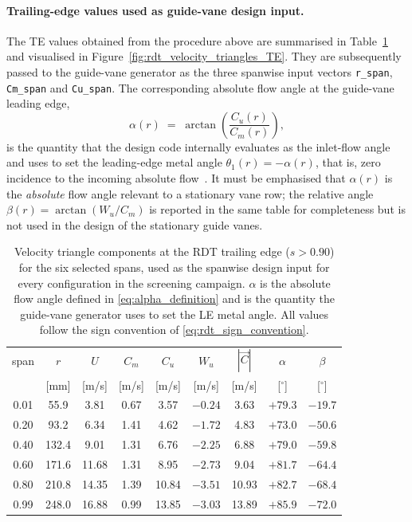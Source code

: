 \paragraph{Trailing-edge values used as guide-vane design input.}
The TE values obtained from the procedure above are summarised in
Table~\ref{tab:rdt_te_values} and visualised in
Figure~\ref{fig:rdt_velocity_triangles_TE}. They are subsequently passed
to the guide-vane generator as the three spanwise input vectors
\texttt{r\_span}, \texttt{Cm\_span} and \texttt{Cu\_span}. The
corresponding absolute flow angle at the guide-vane leading edge,
%
\begin{equation}
\alpha(r) \;=\; \arctan\!\left(\frac{C_u(r)}{C_m(r)}\right),
\label{eq:alpha_definition}
\end{equation}
%
is the quantity that the design code internally evaluates as the
inlet-flow angle and uses to set the leading-edge metal angle
$\theta_1(r)=-\alpha(r)$, that is, zero incidence to the incoming
absolute flow~\cite{Leonsen2025}. It must be emphasised that
$\alpha(r)$ is the \emph{absolute} flow angle relevant to a stationary
vane row; the relative angle $\beta(r)=\arctan(W_u/C_m)$ is reported in
the same table for completeness but is not used in the design of the
stationary guide vanes.
 
\begin{table}[H]
  \centering
  \caption[RDT trailing-edge velocity triangle at six spans]{Velocity
  triangle components at the RDT trailing edge ($s>0.90$) for the six
  selected spans, used as the spanwise design input for every
  configuration in the screening campaign. $\alpha$ is the absolute
  flow angle defined in \eqref{eq:alpha_definition} and is the quantity
  the guide-vane generator uses to set the LE metal angle. All values
  follow the sign convention of \eqref{eq:rdt_sign_convention}.}
  \label{tab:rdt_te_values}
  \begin{tabular}{ccccccccc}
    \hline
    span & $r$ & $U$ & $C_m$ & $C_u$ & $W_u$ & $|\vec{C}|$ & $\alpha$ & $\beta$ \\
         & [mm] & [m/s] & [m/s] & [m/s] & [m/s] & [m/s] & [$^\circ$] & [$^\circ$] \\
    \hline
    0.01 &  55.9 &  3.81 & 0.67 &  3.57 & $-0.24$ &  3.63 & $+79.3$ & $-19.7$ \\
    0.20 &  93.2 &  6.34 & 1.41 &  4.62 & $-1.72$ &  4.83 & $+73.0$ & $-50.6$ \\
    0.40 & 132.4 &  9.01 & 1.31 &  6.76 & $-2.25$ &  6.88 & $+79.0$ & $-59.8$ \\
    0.60 & 171.6 & 11.68 & 1.31 &  8.95 & $-2.73$ &  9.04 & $+81.7$ & $-64.4$ \\
    0.80 & 210.8 & 14.35 & 1.39 & 10.84 & $-3.51$ & 10.93 & $+82.7$ & $-68.4$ \\
    0.99 & 248.0 & 16.88 & 0.99 & 13.85 & $-3.03$ & 13.89 & $+85.9$ & $-72.0$ \\
    \hline
  \end{tabular}
\end{table}
 
